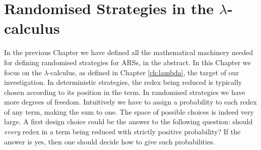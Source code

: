 \chapter{Randomised Strategies in the $\lambda$-calculus}
In the previous Chapter we have defined all the mathematical machinery needed for defining randomised strategies for ARSs, in the abstract. In this Chapter we focus on the $\lambda$-calculus, as defined in Chapter \ref{ch:lambda}, the target of our investigation. In deterministic strategies, the redex being reduced is typically chosen according to its position in the term. In randomised strategies we have more degrees of freedom. Intuitively we have to assign a probability to each redex of any term, making the sum to one. The space of possible choices is indeed very large. A first design choice could be the answer to the following question: should \emph{every} redex in a term being reduced with strictly positive probability? If the answer is yes, then one should decide how to give such probabilities. 
